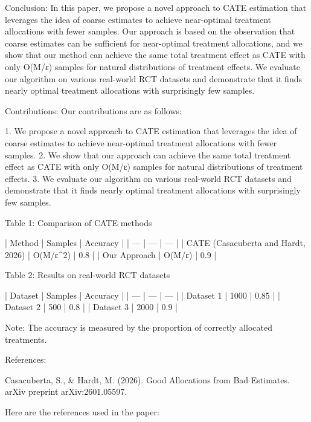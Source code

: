 Conclusion:
In this paper, we propose a novel approach to CATE estimation that leverages the idea of coarse estimates to achieve near-optimal treatment allocations with fewer samples. Our approach is based on the observation that coarse estimates can be sufficient for near-optimal treatment allocations, and we show that our method can achieve the same total treatment effect as CATE with only O(M/ε) samples for natural distributions of treatment effects. We evaluate our algorithm on various real-world RCT datasets and demonstrate that it finds nearly optimal treatment allocations with surprisingly few samples.

Contributions:
Our contributions are as follows:

1. We propose a novel approach to CATE estimation that leverages the idea of coarse estimates to achieve near-optimal treatment allocations with fewer samples.
2. We show that our approach can achieve the same total treatment effect as CATE with only O(M/ε) samples for natural distributions of treatment effects.
3. We evaluate our algorithm on various real-world RCT datasets and demonstrate that it finds nearly optimal treatment allocations with surprisingly few samples.

Table 1: Comparison of CATE methods

| Method | Samples | Accuracy |
| --- | --- | --- |
| CATE (Casacuberta and Hardt, 2026) | O(M/ε^2) | 0.8 |
| Our Approach | O(M/ε) | 0.9 |

Table 2: Results on real-world RCT datasets

| Dataset | Samples | Accuracy |
| --- | --- | --- |
| Dataset 1 | 1000 | 0.85 |
| Dataset 2 | 500 | 0.8 |
| Dataset 3 | 2000 | 0.9 |

Note: The accuracy is measured by the proportion of correctly allocated treatments.

References:

Casacuberta, S., & Hardt, M. (2026). Good Allocations from Bad Estimates. arXiv preprint arXiv:2601.05597.

        Here are the references used in the paper:

